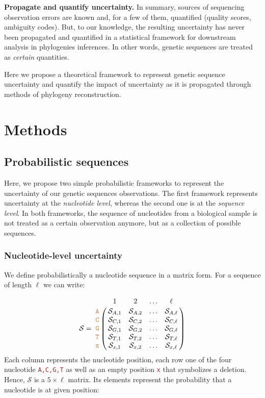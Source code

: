 \documentclass[10pt]{article}
\newcommand{\sq}[1]{\texttt{\textcolor{brown}{#1}}}
\newcommand{\nps}{\mathcal{S}} %
\begin{document}
\textbf{Propagate and quantify uncertainty.}
In summary, sources of sequencing observation errors are known and, for a few of them, quantified (quality scores, ambiguity codes).
But, to our knowledge, the resulting uncertainty has never been propagated and quantified in a statistical framework for downstream analysis in  phylogenies inferences.
In other words, genetic sequences are treated as \emph{certain} quantities.

Here we propose a theoretical framework to represent genetic sequence uncertainty and quantify the impact of uncertainty as it is propagated through methods of phylogeny reconstruction. 







\section{Methods}



\subsection{Probabilistic sequences}

Here, we propose two simple probabilistic frameworks to represent the uncertainty of our genetic sequences observations.
The first framework represents uncertainty at the \emph{nucleotide level}, whereas the second one is at the \emph{sequence level}.
In both frameworks, the sequence of nucleotides from a biological sample is not treated as a certain observation anymore, but as a collection of possible sequences.


\subsubsection{Nucleotide-level uncertainty}
 
We define probabilistically a nucleotide sequence in a matrix form. For a sequence of length $\ell$ we can write:

$$\nps = \bordermatrix{   & 1 & 2 & \ldots & \ell \cr
                \sq{A} & \nps_{A, 1} & \nps_{A, 2} & \ldots & \nps_{A, \ell} \cr
                \sq{C} & \nps_{C, 1} & \nps_{C, 2} & \ldots & \nps_{C, \ell} \cr
                \sq{G} & \nps_{G, 1} & \nps_{G, 2} & \ldots & \nps_{G, \ell} \cr
                \sq{T} & \nps_{T, 1} & \nps_{T, 2} & \ldots & \nps_{T, \ell} \cr 
                \sq{x} & \nps_{x, 1} & \nps_{x, 2} & \ldots & \nps_{x, \ell} \cr 
}$$
Each column represents the nucleotide position, each row one of the four nucleotide \sq{A,C,G,T} as well as an empty position \sq{x} that symbolizes a deletion.
Hence, $\nps$ is a $5\times\ell$ matrix. Its elements represent the probability that a nucleotide is at given position:
\end{document}
